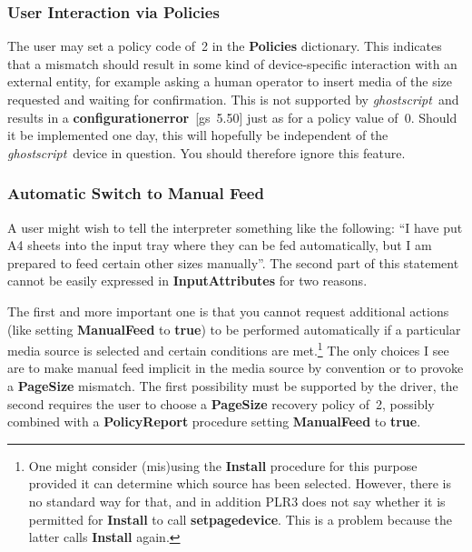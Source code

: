 \documentclass[twoside,a4paper]{article}
\newcommand{\gs}{\textit{ghostscript\/}}
\newcommand{\ps}[1]{{\sffamily\bfseries #1}}	%
\begin{document}

\subsubsection{User Interaction via \ps{Policies}}

The user may set a policy code of~2 in the \ps{Policies} dictionary.
This indicates that a mismatch should result in some kind of device-specific
interaction with an external entity,
for example asking a human operator to insert media of the size requested and
waiting for confirmation.
This is not supported by \gs\ and results in a
\ps{configurationerror}~[gs~5.50] just as for a policy value of~0.
Should it be implemented one day, this will hopefully be independent of
the \gs\ device in question.
You should therefore ignore this feature.


\subsubsection{Automatic Switch to Manual Feed}

A user might wish to tell the interpreter something like the following:
``I have put A4 sheets into the input tray where they can be fed automatically,
but I am prepared to feed certain other sizes manually''.
The second part of this statement cannot be easily expressed in
\ps{InputAttributes} for two reasons.

The first and more important one is that you cannot request additional actions
(like setting \ps{ManualFeed} to \ps{true}) to be performed automatically if a
particular media source is selected and certain conditions are met.\footnote{%
  One might consider (mis)using the \ps{Install} procedure for this purpose
  provided it can determine which source has been selected.
  However, there is no standard way for that,
  and in addition PLR3 does not say whether it is permitted for
  \ps{Install} to call \ps{setpagedevice}.
  This is a problem because the latter calls \ps{Install} again.}
The only choices I see are
to make manual feed implicit in the media source by convention or
to provoke a \ps{PageSize} mismatch.
The first possibility must be supported by the driver,
the second requires the user to choose a \ps{PageSize} recovery policy of~2,
possibly combined with a \ps{PolicyReport} procedure setting \ps{ManualFeed} to
\ps{true}.
\end{document}
